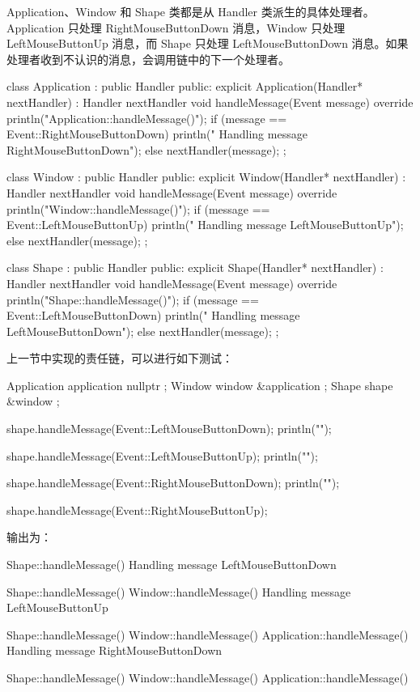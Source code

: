 Application、Window 和 Shape 类都是从 Handler 类派生的具体处理者。Application 只处理 RightMouseButtonDown 消息，Window 只处理 LeftMouseButtonUp 消息，而 Shape 只处理 LeftMouseButtonDown 消息。如果处理者收到不认识的消息，会调用链中的下一个处理者。

\begin{cpp}
class Application : public Handler
{
    public:
        explicit Application(Handler* nextHandler) : Handler { nextHandler } { }
        void handleMessage(Event message) override
        {
            println("Application::handleMessage()");
            if (message == Event::RightMouseButtonDown) {
                println(" Handling message RightMouseButtonDown");
            } else { nextHandler(message); }
        }
};

class Window : public Handler
{
    public:
        explicit Window(Handler* nextHandler) : Handler { nextHandler } { }
        void handleMessage(Event message) override
        {
            println("Window::handleMessage()");
            if (message == Event::LeftMouseButtonUp) {
                println(" Handling message LeftMouseButtonUp");
            } else { nextHandler(message); }
        }
};

class Shape : public Handler
{
    public:
        explicit Shape(Handler* nextHandler) : Handler { nextHandler } { }
        void handleMessage(Event message) override
        {
            println("Shape::handleMessage()");
            if (message == Event::LeftMouseButtonDown) {
                println(" Handling message LeftMouseButtonDown");
            } else { nextHandler(message); }
        }
};
\end{cpp}


上一节中实现的责任链，可以进行如下测试：

\begin{cpp}
Application application { nullptr };
Window window { &application };
Shape shape { &window };

shape.handleMessage(Event::LeftMouseButtonDown);
println("");

shape.handleMessage(Event::LeftMouseButtonUp);
println("");

shape.handleMessage(Event::RightMouseButtonDown);
println("");

shape.handleMessage(Event::RightMouseButtonUp);
\end{cpp}

输出为：

\begin{shell}
Shape::handleMessage()
    Handling message LeftMouseButtonDown

Shape::handleMessage()
Window::handleMessage()
    Handling message LeftMouseButtonUp

Shape::handleMessage()
Window::handleMessage()
Application::handleMessage()
    Handling message RightMouseButtonDown

Shape::handleMessage()
Window::handleMessage()
Application::handleMessage()
\end{shell}

